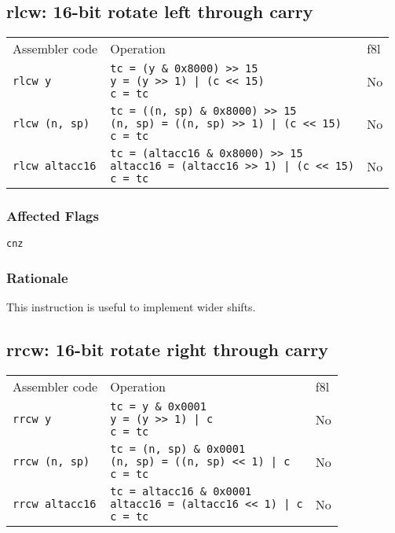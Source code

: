 \documentclass{book}
\begin{document}
\subsection{rlcw: 16-bit rotate left through carry}

\begin{tabular}{l l l}
Assembler code         & Operation                                                                                                             & f8l \\
\texttt{rlcw y}        & \makecell{\texttt{tc = (y \& 0x8000) >> 15}\\\texttt{y = (y >> 1) | (c << 15)}\\\texttt{c = tc}}                      & No \\
\texttt{rlcw (n, sp)}  & \makecell{\texttt{tc = ((n, sp) \& 0x8000) >> 15}\\\texttt{(n, sp) = ((n, sp) >> 1) | (c << 15)}\\\texttt{c = tc}}    & No \\
\texttt{rlcw altacc16} & \makecell{\texttt{tc = (altacc16 \& 0x8000) >> 15}\\\texttt{altacc16 = (altacc16 >> 1) | (c << 15)}\\\texttt{c = tc}} & No
\end{tabular}

\subsubsection*{Affected Flags}

\texttt{cnz}

\subsubsection*{Rationale}

This instruction is useful to implement wider shifts.


\subsection{rrcw: 16-bit rotate right through carry}

\begin{tabular}{l l l}
Assembler code         & Operation                                                                                              & f8l \\
\texttt{rrcw y}        & \makecell{\texttt{tc = y \& 0x0001}\\\texttt{y = (y >> 1) | c}\\\texttt{c = tc}}                      & No \\
\texttt{rrcw (n, sp)}  & \makecell{\texttt{tc = (n, sp) \& 0x0001}\\\texttt{(n, sp) = ((n, sp) << 1) | c}\\\texttt{c = tc}}    & No \\
\texttt{rrcw altacc16} & \makecell{\texttt{tc = altacc16 \& 0x0001}\\\texttt{altacc16 = (altacc16 << 1) | c}\\\texttt{c = tc}} & No
\end{tabular}
\end{document}
